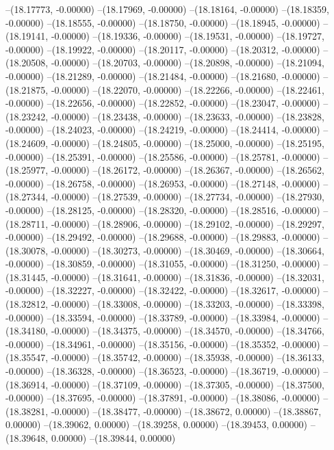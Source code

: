 --(18.17773, -0.00000)
--(18.17969, -0.00000)
--(18.18164, -0.00000)
--(18.18359, -0.00000)
--(18.18555, -0.00000)
--(18.18750, -0.00000)
--(18.18945, -0.00000)
--(18.19141, -0.00000)
--(18.19336, -0.00000)
--(18.19531, -0.00000)
--(18.19727, -0.00000)
--(18.19922, -0.00000)
--(18.20117, -0.00000)
--(18.20312, -0.00000)
--(18.20508, -0.00000)
--(18.20703, -0.00000)
--(18.20898, -0.00000)
--(18.21094, -0.00000)
--(18.21289, -0.00000)
--(18.21484, -0.00000)
--(18.21680, -0.00000)
--(18.21875, -0.00000)
--(18.22070, -0.00000)
--(18.22266, -0.00000)
--(18.22461, -0.00000)
--(18.22656, -0.00000)
--(18.22852, -0.00000)
--(18.23047, -0.00000)
--(18.23242, -0.00000)
--(18.23438, -0.00000)
--(18.23633, -0.00000)
--(18.23828, -0.00000)
--(18.24023, -0.00000)
--(18.24219, -0.00000)
--(18.24414, -0.00000)
--(18.24609, -0.00000)
--(18.24805, -0.00000)
--(18.25000, -0.00000)
--(18.25195, -0.00000)
--(18.25391, -0.00000)
--(18.25586, -0.00000)
--(18.25781, -0.00000)
--(18.25977, -0.00000)
--(18.26172, -0.00000)
--(18.26367, -0.00000)
--(18.26562, -0.00000)
--(18.26758, -0.00000)
--(18.26953, -0.00000)
--(18.27148, -0.00000)
--(18.27344, -0.00000)
--(18.27539, -0.00000)
--(18.27734, -0.00000)
--(18.27930, -0.00000)
--(18.28125, -0.00000)
--(18.28320, -0.00000)
--(18.28516, -0.00000)
--(18.28711, -0.00000)
--(18.28906, -0.00000)
--(18.29102, -0.00000)
--(18.29297, -0.00000)
--(18.29492, -0.00000)
--(18.29688, -0.00000)
--(18.29883, -0.00000)
--(18.30078, -0.00000)
--(18.30273, -0.00000)
--(18.30469, -0.00000)
--(18.30664, -0.00000)
--(18.30859, -0.00000)
--(18.31055, -0.00000)
--(18.31250, -0.00000)
--(18.31445, -0.00000)
--(18.31641, -0.00000)
--(18.31836, -0.00000)
--(18.32031, -0.00000)
--(18.32227, -0.00000)
--(18.32422, -0.00000)
--(18.32617, -0.00000)
--(18.32812, -0.00000)
--(18.33008, -0.00000)
--(18.33203, -0.00000)
--(18.33398, -0.00000)
--(18.33594, -0.00000)
--(18.33789, -0.00000)
--(18.33984, -0.00000)
--(18.34180, -0.00000)
--(18.34375, -0.00000)
--(18.34570, -0.00000)
--(18.34766, -0.00000)
--(18.34961, -0.00000)
--(18.35156, -0.00000)
--(18.35352, -0.00000)
--(18.35547, -0.00000)
--(18.35742, -0.00000)
--(18.35938, -0.00000)
--(18.36133, -0.00000)
--(18.36328, -0.00000)
--(18.36523, -0.00000)
--(18.36719, -0.00000)
--(18.36914, -0.00000)
--(18.37109, -0.00000)
--(18.37305, -0.00000)
--(18.37500, -0.00000)
--(18.37695, -0.00000)
--(18.37891, -0.00000)
--(18.38086, -0.00000)
--(18.38281, -0.00000)
--(18.38477, -0.00000)
--(18.38672, 0.00000)
--(18.38867, 0.00000)
--(18.39062, 0.00000)
--(18.39258, 0.00000)
--(18.39453, 0.00000)
--(18.39648, 0.00000)
--(18.39844, 0.00000)
